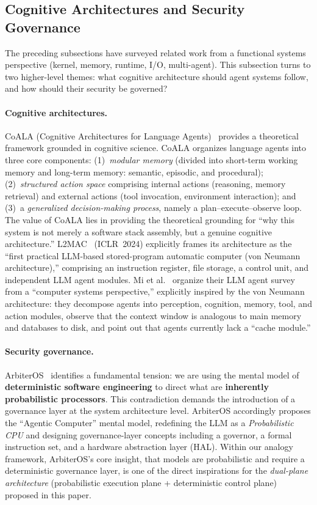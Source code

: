 \subsection{Cognitive Architectures and Security Governance}
\label{sec:related-cognition-security}

The preceding subsections have surveyed related work from a functional systems perspective (kernel, memory, runtime, I/O, multi-agent).
This subsection turns to two higher-level themes: what cognitive architecture should agent systems follow, and how should their security be governed?

\paragraph{Cognitive architectures.}
CoALA (Cognitive Architectures for Language Agents)~\cite{sumers2024coala} provides a theoretical framework grounded in cognitive science.
CoALA organizes language agents into three core components:
(1)~\textit{modular memory} (divided into short-term working memory and long-term memory: semantic, episodic, and procedural);
(2)~\textit{structured action space} comprising internal actions (reasoning, memory retrieval) and external actions (tool invocation, environment interaction); and
(3)~a \textit{generalized decision-making process}, namely a plan--execute--observe loop.
The value of CoALA lies in providing the theoretical grounding for ``why this system is not merely a software stack assembly, but a genuine cognitive architecture.''
L2MAC~\cite{holt2024l2mac} (ICLR~2024) explicitly frames its architecture as the ``first practical LLM-based stored-program automatic computer (von Neumann architecture),'' comprising an instruction register, file storage, a control unit, and independent LLM agent modules.
Mi et al.~\cite{mi2025llmagentscomputersystems} organize their LLM agent survey from a ``computer systems perspective,'' explicitly inspired by the von Neumann architecture: they decompose agents into perception, cognition, memory, tool, and action modules, observe that the context window is analogous to main memory and databases to disk, and point out that agents currently lack a ``cache module.''

\paragraph{Security governance.}
ArbiterOS~\cite{arbiteros2025} identifies a fundamental tension: we are using the mental model of \textbf{deterministic software engineering} to direct what are \textbf{inherently probabilistic processors}.
This contradiction demands the introduction of a governance layer at the system architecture level.
ArbiterOS accordingly proposes the ``Agentic Computer'' mental model, redefining the LLM as a \textit{Probabilistic CPU} and designing governance-layer concepts including a governor, a formal instruction set, and a hardware abstraction layer (HAL).
Within our analogy framework, ArbiterOS's core insight, that models are probabilistic and require a deterministic governance layer, is one of the direct inspirations for the \textit{dual-plane architecture} (probabilistic execution plane + deterministic control plane) proposed in this paper.

